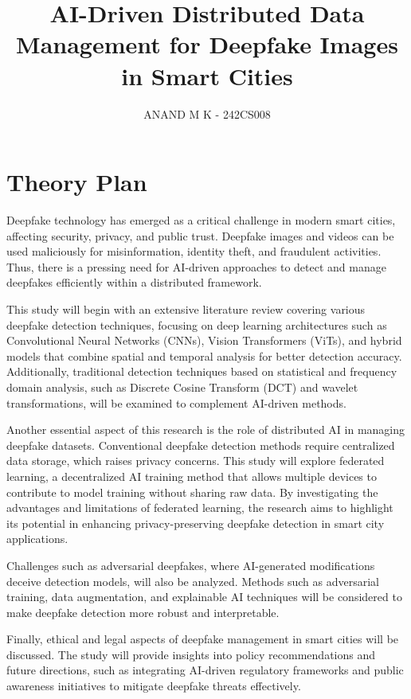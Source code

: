 \documentclass[a4paper,12pt]{article}
\title{AI-Driven Distributed Data Management for Deepfake Images in Smart Cities}
\author{ANAND M K - 242CS008}
\date{}
\begin{document}
\maketitle

\section{Theory Plan}
Deepfake technology has emerged as a critical challenge in modern smart cities, affecting security, privacy, and public trust. Deepfake images and videos can be used maliciously for misinformation, identity theft, and fraudulent activities. Thus, there is a pressing need for AI-driven approaches to detect and manage deepfakes efficiently within a distributed framework. 

This study will begin with an extensive literature review covering various deepfake detection techniques, focusing on deep learning architectures such as Convolutional Neural Networks (CNNs), Vision Transformers (ViTs), and hybrid models that combine spatial and temporal analysis for better detection accuracy. Additionally, traditional detection techniques based on statistical and frequency domain analysis, such as Discrete Cosine Transform (DCT) and wavelet transformations, will be examined to complement AI-driven methods.

Another essential aspect of this research is the role of distributed AI in managing deepfake datasets. Conventional deepfake detection methods require centralized data storage, which raises privacy concerns. This study will explore federated learning, a decentralized AI training method that allows multiple devices to contribute to model training without sharing raw data. By investigating the advantages and limitations of federated learning, the research aims to highlight its potential in enhancing privacy-preserving deepfake detection in smart city applications.

Challenges such as adversarial deepfakes, where AI-generated modifications deceive detection models, will also be analyzed. Methods such as adversarial training, data augmentation, and explainable AI techniques will be considered to make deepfake detection more robust and interpretable.

Finally, ethical and legal aspects of deepfake management in smart cities will be discussed. The study will provide insights into policy recommendations and future directions, such as integrating AI-driven regulatory frameworks and public awareness initiatives to mitigate deepfake threats effectively.
\end{document}
